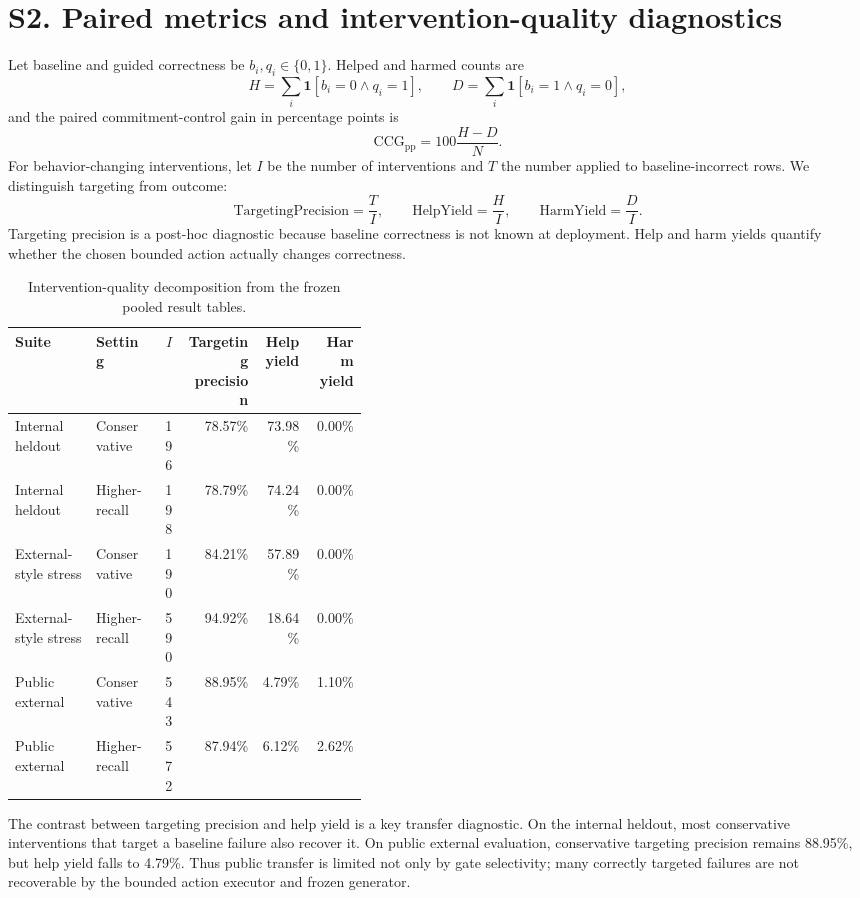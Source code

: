 \documentclass[11pt]{article}
\begin{document}
\section*{S2. Paired metrics and intervention-quality diagnostics}
Let baseline and guided correctness be \(b_i,q_i\in\{0,1\}\). Helped and harmed counts are
\[
H=\sum_i \mathbf{1}[b_i=0\land q_i=1],\qquad
D=\sum_i \mathbf{1}[b_i=1\land q_i=0],
\]
and the paired commitment-control gain in percentage points is
\[
\mathrm{CCG}_{\mathrm{pp}}=100\frac{H-D}{N}.
\]
For behavior-changing interventions, let \(I\) be the number of interventions and \(T\) the number applied to baseline-incorrect rows. We distinguish targeting from outcome:
\[
\mathrm{TargetingPrecision}=\frac{T}{I},\qquad
\mathrm{HelpYield}=\frac{H}{I},\qquad
\mathrm{HarmYield}=\frac{D}{I}.
\]
Targeting precision is a post-hoc diagnostic because baseline correctness is not known at deployment. Help and harm yields quantify whether the chosen bounded action actually changes correctness.

\begin{table}[H]
\centering
\small
\caption{Intervention-quality decomposition from the frozen pooled result tables.}
\begin{tabularx}{\linewidth}{p{0.23\linewidth}p{0.18\linewidth}rrrr}
\toprule
Suite & Setting & \(I\) & Targeting precision & Help yield & Harm yield \\
\midrule
Internal heldout & Conservative & 196 & 78.57\% & 73.98\% & 0.00\% \\
Internal heldout & Higher-recall & 198 & 78.79\% & 74.24\% & 0.00\% \\
External-style stress & Conservative & 190 & 84.21\% & 57.89\% & 0.00\% \\
External-style stress & Higher-recall & 590 & 94.92\% & 18.64\% & 0.00\% \\
Public external & Conservative & 543 & 88.95\% & 4.79\% & 1.10\% \\
Public external & Higher-recall & 572 & 87.94\% & 6.12\% & 2.62\% \\
\bottomrule
\end{tabularx}
\end{table}

The contrast between targeting precision and help yield is a key transfer diagnostic. On the internal heldout, most conservative interventions that target a baseline failure also recover it. On public external evaluation, conservative targeting precision remains 88.95\%, but help yield falls to 4.79\%. Thus public transfer is limited not only by gate selectivity; many correctly targeted failures are not recoverable by the bounded action executor and frozen generator.
\end{document}

